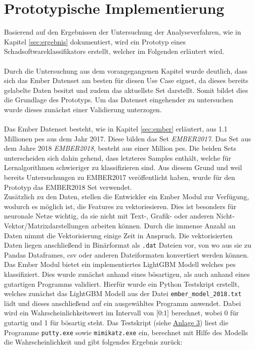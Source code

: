\documentclass[
    12pt, %
    DIV10,
    ngerman, %
    a4paper, %
    oneside, %
    titlepage, %
    parskip=half, %
    headings=normal, %
    listof=totoc, %
    bibliography=totoc, %
    index=totoc, %
    captions=tableheading, %
    final %
]{scrreprt}
\begin{document}
\chapter{Prototypische Implementierung}
Basierend auf den Ergebnissen der Untersuchung der Analyseverfahren, wie in Kapitel \ref{sec:ergebnis} dokumentiert, wird ein Prototyp eines Schadsoftwareklassifikators erstellt, welcher im Folgenden erläutert wird.\\\\
Durch die Untersuchung aus dem vorangegangenen Kapitel wurde deutlich, dass sich das Ember Datenset am besten für diesen Use Case eignet, da dieses bereits gelabelte Daten besitzt und zudem das aktuellste Set darstellt. Somit bildet dies die Grundlage des Prototyps. Um das Datenset eingehender zu untersuchen wurde dieses zunächst einer Validierung unterzogen.\\\\
Das Ember Datenset besteht, wie in Kapitel \ref{sec:ember} erläutert, aus 1.1 Millionen \ac{pes} aus dem Jahr 2017. Diese bilden das Set \emph{EMBER2017}. Das Set aus dem Jahre 2018 \emph{EMBER2018}, besteht aus einer Million \ac{pes}. Die beiden Sets unterscheiden sich dahin gehend, dass letzteres Samples enthält, welche für Lernalgorithmen schwieriger zu klassifizieren sind. Aus diesem Grund und weil \textcite{anderson2018ember} bereits Untersuchungen zu EMBER2017 veröffentlicht haben, wurde für den Prototyp das EMBER2018 Set
 verwendet.\\Zusätzlich zu den Daten, stellen die Entwickler ein Ember Modul zur Verfügung, wodurch es möglich ist, die Features zu vektoriesieren. Dies ist besonders für neuronale Netze wichtig, da sie nicht mit Text-, Grafik- oder anderen Nicht-Vektor/Matrixdarstellungen arbeiten können. Durch die immense Anzahl an Daten nimmt die Vektorisierung einige Zeit in Anspruch. Die vektorisierten Daten liegen anschlie{\ss}end in Binärformat als \texttt{.dat} Dateien vor, von wo aus sie zu Pandas Dataframes, \ac{csv} oder anderen Dateiformaten konvertiert werden können.\\
Das Ember Modul bietet ein implementiertes LightGBM Modell welches \ac{pes} klassifiziert. Dies wurde zunächst anhand eines bösartigen, als auch anhand eines gutartigen Programms validiert.
Hierfür wurde ein Python Testskript erstellt, welches zunächst das LightGBM Modell aus der Datei \texttt{ember\_model\_2018.txt} lädt und dieses anschlie{\ss}end auf ein ausgewähltes Programm anwendet. Dabei wird ein Wahrscheinlichkeitswert im Intervall von [0:1] berechnet, wobei 0 für gutartig und 1 für bösartig steht. Das Testskript (siehe \hyperref[testskript]{Anlage 3}) liest die Programme \texttt{putty.exe} sowie \texttt{mimikatz.exe} ein, berechnet mit Hilfe des Modells die Wahrscheinlichkeit und gibt folgendes Ergebnis zurück:
\end{document}
